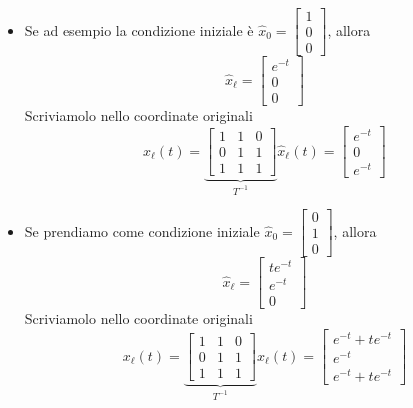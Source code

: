 \documentclass{article}
\numberwithin{equation}{subsection}
\begin{document}
\begin{itemize}
\item Se ad esempio la condizione iniziale è $\hat x_0 = \begin{bmatrix} 1\\0\\0 \end{bmatrix}$, allora
\begin{equation}
    \hat x_\ell = \begin{bmatrix} e^{-t}\\0\\0 \end{bmatrix}
\end{equation}
Scriviamolo nello coordinate originali
\begin{equation}
    x_\ell(t) = \underbrace{\begin{bmatrix}
        1&1&0\\
        0&1&1\\
        1&1&1
    \end{bmatrix}}_{T^{-1}} \hat x_\ell (t) = 
    \begin{bmatrix}
        e^{-t}\\
        0\\
        e^{-t}
    \end{bmatrix}
\end{equation}
\item Se prendiamo come condizione iniziale $\hat x_0 = \begin{bmatrix} 0\\1\\0 \end{bmatrix}$, allora
\begin{equation}
    \hat x_\ell = \begin{bmatrix} te^{-t}\\e^{-t}\\0 \end{bmatrix}
\end{equation}
Scriviamolo nello coordinate originali
\begin{equation}
    x_\ell(t) = \underbrace{\begin{bmatrix}
        1&1&0\\
        0&1&1\\
        1&1&1
    \end{bmatrix} }_{T^{-1}} \hat x_\ell (t) = 
    \begin{bmatrix}
        e^{-t} + te^{-t}\\
        e^{-t}\\
        e^{-t} + te^{-t}
    \end{bmatrix}
\end{equation}



\end{itemize}
\end{document}
